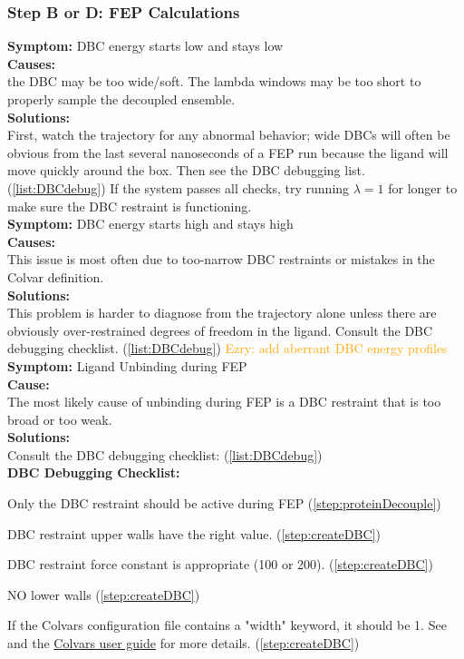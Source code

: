 \documentclass[9pt,tutorial]{Styling/livecoms}
\newcommand{\ezry}[1]{\textcolor{orange}{Ezry: #1}}
\begin{document}
\subsubsection{Step B or D: FEP Calculations}
\noindent\textbf{Symptom:}  DBC energy starts low and stays low\\
\textbf{Causes:}\\
the DBC may be too wide/soft. The lambda windows may be too short to properly sample the decoupled ensemble.\\
\textbf{Solutions:}\\
First, watch the trajectory for any abnormal behavior; wide DBCs will often be obvious from the last several nanoseconds of a FEP run because the ligand will move quickly around the box. Then see the DBC debugging list. (\ref{list:DBCdebug}) If the system passes all checks, try running $\lambda=1$ for longer to make sure the DBC restraint is functioning.\\

\noindent\textbf{Symptom:} DBC energy starts high and stays high\\
\textbf{Causes:}\\
This issue is most often due to too-narrow DBC restraints or mistakes in the Colvar definition.\\
\textbf{Solutions:}\\
This problem is harder to diagnose from the trajectory alone unless there are obviously over-restrained degrees of freedom in the ligand. Consult the DBC debugging checklist. (\ref{list:DBCdebug})
\ezry{add aberrant DBC energy profiles}\\

\noindent\textbf{Symptom:} Ligand Unbinding during FEP\\
\textbf{Cause:}\\
The most likely cause of unbinding during FEP is a DBC restraint that is too broad or too weak.\\
\textbf{Solutions:}\\
 Consult the DBC debugging checklist: (\ref{list:DBCdebug})\\

\textbf{DBC Debugging Checklist:}%
\begin{todolist} \label{list:DBCdebug}
    \item Only the DBC restraint should be active during FEP (\ref{step:proteinDecouple})
    \item DBC restraint upper walls have the right value. (\ref{step:createDBC})
    \item DBC restraint force constant is appropriate (100 or 200). (\ref{step:createDBC})
    \item NO lower walls (\ref{step:createDBC})
    \item If the Colvars configuration file contains a "width" keyword, it should be 1. See \cite{Fiorin2013} and the \href{http://colvars.github.io/colvars-refman-vmd/colvars-refman-vmd.html#sec:colvar_grid_params}{Colvars user guide} for more details. (\ref{step:createDBC})
\end{todolist}
\end{document}
